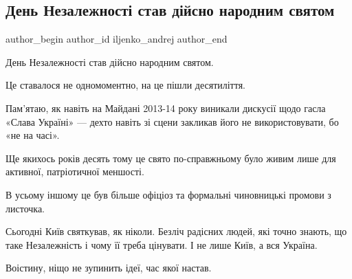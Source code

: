  
 
 
 
 
 
\subsection{День Незалежності став дійсно народним святом}
\label{sec:24_08_2021.fb.iljenko_andrej.1.nezalezhnist_svjato}
 
\ifcmt
 author_begin
   author_id iljenko_andrej
 author_end
\fi

День Незалежності став дійсно народним святом.

Це ставалося не одномоментно, на це пішли десятиліття. 

Пам’ятаю, як навіть на Майдані 2013-14 року виникали дискусії щодо гасла «Слава
Україні» — дехто навіть зі сцени закликав його не використовувати, бо «не на
часі».

Ще якихось років десять тому це свято по-справжньому було живим лише для
активної, патріотичної меншості. 

В усьому іншому це був більше офіціоз та формальні чиновницькі промови з
листочка. 

Сьогодні Київ святкував, як ніколи. Безліч радісних людей, які точно знають, що
таке Незалежність і чому її треба цінувати. І не лише Київ, а вся Україна.

Воістину, ніщо не зупинить ідеї, час якої настав.
